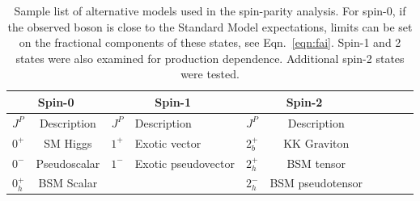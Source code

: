\begin{table}[htbp]
\begin{center}
\begin{tabular}{lcclcclccl}
\hline
\hline
\multicolumn{2}{c}{Spin-0} & \multicolumn{2}{c}{Spin-1} & \multicolumn{2}{c}{Spin-2} \\
\hline
$J^P$ & Description & $J^P$ & Description & $J^P$ & Description \\
\hline
$0^+$ & SM Higgs & $1^+$ & Exotic vector & $2_b^+$ & KK Graviton \\
$0^-$ & Pseudoscalar & $1^-$ & Exotic pseudovector & $2_h^+$ & BSM tensor \\
$0_h^+$ & BSM Scalar & & & $2_h^-$ & BSM pseudotensor \\
\hline
\end{tabular}
\caption[List of Alternative Spin-Parity States for $125.6$ $\rm{GeV}$ Resonance]{Sample list of alternative models used in the spin-parity analysis. For spin-0, if the observed boson is close to the Standard Model expectations, limits can be set on the fractional components of these states, see Eqn.~\ref{eqn:fai}. Spin-1 and 2 states were also examined for production dependence. Additional spin-2 states were tested.}
\label{tbl:JPStates}
\end{center}
\end{table}

